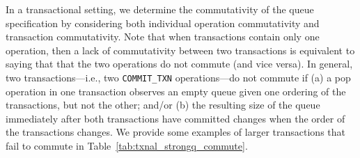 In a transactional setting, we determine the commutativity of the queue specification by considering both individual operation commutativity and transaction commutativity. 
Note that when transactions contain only one operation, then a lack of commutativity between two transactions is equivalent to saying that that the two operations do not commute (and vice versa). 
In general, two transactions---i.e., two \texttt{COMMIT\_TXN} operations---do not commute if (a) a pop operation in one transaction observes an empty queue given one ordering of the transactions, but not the other; and/or (b) the resulting size of the queue immediately after both transactions have committed changes when the order of the transactions changes. We provide some examples of larger transactions that fail to commute in Table~\ref{tab:txnal_strongq_commute}.
   
